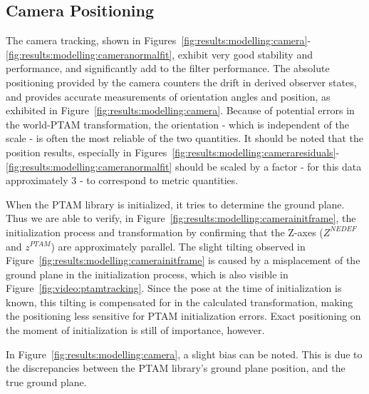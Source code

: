     \subsection{Camera Positioning}
        The camera tracking, shown in Figures~\ref{fig:results:modelling:camera}-\ref{fig:results:modelling:cameranormalfit},
        exhibit very good stability and performance, and significantly add to
        the filter performance. The absolute positioning provided by the
        camera counters the drift in derived observer states,
        and provides accurate measurements of orientation angles and position, as
        exhibited in Figure~\ref{fig:results:modelling:camera}.
        Because of potential errors in the world-PTAM transformation, the orientation - which
        is independent of the scale - is often the most reliable of the two quantities.
        It should be noted that the position results, especially in
        Figures~\ref{fig:results:modelling:cameraresiduals}-\ref{fig:results:modelling:cameranormalfit}
        should be scaled by a factor - for this data approximately $3$ - to correspond
        to metric quantities.

        When the PTAM library is initialized, it tries to determine the
        ground plane. Thus we are able to verify, in Figure~\ref{fig:results:modelling:camerainitframe}, the initialization process and transformation
        by confirming that the Z-axes ($Z^{NEDEF}$ and $z^{PTAM}$) are approximately parallel.
        The slight tilting observed in Figure~\ref{fig:results:modelling:camerainitframe}
        is caused by a misplacement of the ground plane in the initialization process,
        which is also visible in Figure~\ref{fig:video:ptamtracking}.
        Since the pose at the time of initialization is known, this tilting
        is compensated for in the calculated transformation, making the positioning
        less sensitive for PTAM initialization errors.
        Exact positioning on the moment of initialization is still of importance, however.

        In Figure~\ref{fig:results:modelling:camera}, a slight bias can be noted.
        This is due to the discrepancies between the PTAM library's ground plane position,
        and the true ground plane.

